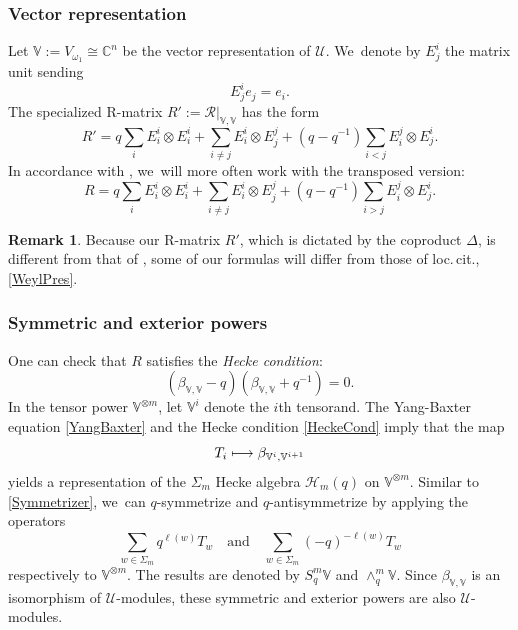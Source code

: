 \documentclass[JEP,XML,SOM,Unicode,published]{cedram}
\newcommand\mto{\mathchoice{\longmapsto}{\mapsto}{\mapsto}{\mapsto}}
\theoremstyle{definition}
\newtheorem{rem}[thm]{Remark}
\newcommand{\CC}{\mathbb{C}}
\newcommand{\Hecke}{\mathcal{H}}
\begin{document}
\subsubsection{Vector representation}
Let $\mathbb{V}:=V_{\omega_1}\cong \CC^n$ be the vector representation of $\mathcal{U}$. We~denote by $E_j^i$ the matrix unit sending
\[
E_{j}^ie_j=e_i.
\]
The specialized R-matrix $R':=\mathcal{R}\big|_{\mathbb{V},\mathbb{V}}$ has the form
\begin{equation*}
R'=q\sum_i E_{i}^i\otimes E_{i}^i+\sum_{i\not=j}E_{i}^i\otimes E_{j}^j+(q-q^{-1})\sum_{i<j}E_{i}^j\otimes E_{j}^i.
\end{equation*}
In accordance with \cite{JordanMult}, we~will more often work with the transposed version:
\begin{equation}
R=q\sum_i E_{i}^i\otimes E_{i}^i+\sum_{i\not=j}E_{i}^i\otimes E_{j}^j+(q-q^{-1})\sum_{i>j}E_{i}^j\otimes E_{j}^i.
\label{VecRMatrix}
\end{equation}

\begin{rem}
Because our R-matrix $R'$, which is dictated by the coproduct $\Delta$, is different from that of \cite{JordanMult}, some of our formulas will differ from those of loc.\,cit., \eg \eqref{WeylPres}.
\end{rem}

\subsubsection{Symmetric and exterior powers}
One can check that $R$ satisfies the \textit{Hecke condition}:
\begin{equation}
(\beta_{\mathbb{V},\mathbb{V}}-q)(\beta_{\mathbb{V},\mathbb{V}}+q^{-1})=0.
\label{HeckeCond}
\end{equation}
In the tensor power $\mathbb{V}^{\otimes m}$, let $\mathbb{V}^i$ denote the $i$th tensorand.
The Yang-Baxter equation \eqref{YangBaxter} and the Hecke condition \eqref{HeckeCond} imply that the map
\[
T_i\mto \beta_{\mathbb{V}^i,\mathbb{V}^{i+1}}
\]
yields a representation of the $\Sigma_m$ Hecke algebra $\Hecke_m(q)$ on $\mathbb{V}^{\otimes m}$.
Similar to \ref{Symmetrizer}, we~can $q$-symmetrize and $q$-antisymmetrize by applying the operators
\[
\sum_{w\in\Sigma_m}q^{\ell(w)}T_w\quad\text{and}\quad
\sum_{w\in\Sigma_m}(-q)^{-\ell(w)}T_w
\]
respectively to $\mathbb{V}^{\otimes m}$.
The results are denoted by $S_q^m\mathbb{V}$ and $\wedge_q^m\mathbb{V}$.
Since $\beta_{\mathbb{V},\mathbb{V}}$ is an isomorphism of $\mathcal{U}$-modules, these symmetric and exterior powers are also $\mathcal{U}$-modules.
\end{document}
